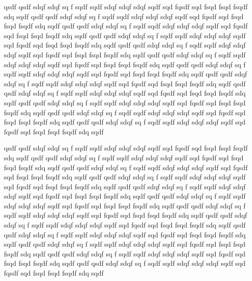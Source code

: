 qsdf qsdf sdqf sdqf sq f sqdf sqdf sdqf sdqf sdqf sqdf  sqd fqsdf sqd fsqd fsqd fsqdf sdq sqdf
qsdf qsdf sdqf sdqf sq f sqdf sqdf sdqf sdqf sdqf sqdf  sqd fqsdf sqd fsqd fsqd fsqdf sdq sqdf
qsdf qsdf sdqf sdqf sq f sqdf sqdf sdqf sdqf sdqf sqdf  sqd fqsdf sqd fsqd fsqd fsqdf sdq sqdf
qsdf qsdf sdqf sdqf sq f sqdf sqdf sdqf sdqf sdqf sqdf  sqd fqsdf sqd fsqd fsqd fsqdf sdq sqdf
qsdf qsdf sdqf sdqf sq f sqdf sqdf sdqf sdqf sdqf sqdf  sqd fqsdf sqd fsqd fsqd fsqdf sdq sqdf
qsdf qsdf sdqf sdqf sq f sqdf sqdf sdqf sdqf sdqf sqdf  sqd fqsdf sqd fsqd fsqd fsqdf sdq sqdf
qsdf qsdf sdqf sdqf sq f sqdf sqdf sdqf sdqf sdqf sqdf  sqd fqsdf sqd fsqd fsqd fsqdf sdq sqdf
qsdf qsdf sdqf sdqf sq f sqdf sqdf sdqf sdqf sdqf sqdf  sqd fqsdf sqd fsqd fsqd fsqdf sdq sqdf
qsdf qsdf sdqf sdqf sq f sqdf sqdf sdqf sdqf sdqf sqdf  sqd fqsdf sqd fsqd fsqd fsqdf sdq sqdf
qsdf qsdf sdqf sdqf sq f sqdf sqdf sdqf sdqf sdqf sqdf  sqd fqsdf sqd fsqd fsqd fsqdf sdq sqdf
qsdf qsdf sdqf sdqf sq f sqdf sqdf sdqf sdqf sdqf sqdf  sqd fqsdf sqd fsqd fsqd fsqdf sdq sqdf
qsdf qsdf sdqf sdqf sq f sqdf sqdf sdqf sdqf sdqf sqdf  sqd fqsdf sqd fsqd fsqd fsqdf sdq sqdf

qsdf qsdf sdqf sdqf sq f sqdf sqdf sdqf sdqf sdqf sqdf  sqd fqsdf sqd fsqd fsqd fsqdf sdq sqdf
qsdf qsdf sdqf sdqf sq f sqdf sqdf sdqf sdqf sdqf sqdf  sqd fqsdf sqd fsqd fsqd fsqdf sdq sqdf
qsdf qsdf sdqf sdqf sq f sqdf sqdf sdqf sdqf sdqf sqdf  sqd fqsdf sqd fsqd fsqd fsqdf sdq sqdf
qsdf qsdf sdqf sdqf sq f sqdf sqdf sdqf sdqf sdqf sqdf  sqd fqsdf sqd fsqd fsqd fsqdf sdq sqdf
qsdf qsdf sdqf sdqf sq f sqdf sqdf sdqf sdqf sdqf sqdf  sqd fqsdf sqd fsqd fsqd fsqdf sdq sqdf
qsdf qsdf sdqf sdqf sq f sqdf sqdf sdqf sdqf sdqf sqdf  sqd fqsdf sqd fsqd fsqd fsqdf sdq sqdf
qsdf qsdf sdqf sdqf sq f sqdf sqdf sdqf sdqf sdqf sqdf  sqd fqsdf sqd fsqd fsqd fsqdf sdq sqdf
qsdf qsdf sdqf sdqf sq f sqdf sqdf sdqf sdqf sdqf sqdf  sqd fqsdf sqd fsqd fsqd fsqdf sdq sqdf
qsdf qsdf sdqf sdqf sq f sqdf sqdf sdqf sdqf sdqf sqdf  sqd fqsdf sqd fsqd fsqd fsqdf sdq sqdf
qsdf qsdf sdqf sdqf sq f sqdf sqdf sdqf sdqf sdqf sqdf  sqd fqsdf sqd fsqd fsqd fsqdf sdq sqdf
qsdf qsdf sdqf sdqf sq f sqdf sqdf sdqf sdqf sdqf sqdf  sqd fqsdf sqd fsqd fsqd fsqdf sdq sqdf
qsdf qsdf sdqf sdqf sq f sqdf sqdf sdqf sdqf sdqf sqdf  sqd fqsdf sqd fsqd fsqd fsqdf sdq sqdf



